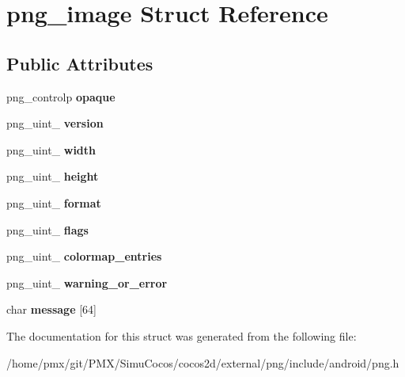 \hypertarget{structpng__image}{}\section{png\+\_\+image Struct Reference}
\label{structpng__image}
\subsection*{Public Attributes}
\begin{DoxyCompactItemize}
\item 
\mbox{\label{structpng__image_a7b502596648744e2ee0c8788e2c6e918}} 
png\+\_\+controlp {\bfseries opaque}
\item 
\mbox{\label{structpng__image_a8c276ba2922051ff0ff9175ab1e23ed1}} 
png\+\_\+uint\+\_ {\bfseries version}
\item 
\mbox{\label{structpng__image_a72ec07853c82c632c2d7b3c68c62b659}} 
png\+\_\+uint\+\_ {\bfseries width}
\item 
\mbox{\label{structpng__image_aaf3cb3eb97ee0938a5e870a96fd1fa48}} 
png\+\_\+uint\+\_ {\bfseries height}
\item 
\mbox{\label{structpng__image_a8a7469310ce4682932b0bc94624f35d1}} 
png\+\_\+uint\+\_ {\bfseries format}
\item 
\mbox{\label{structpng__image_ab9519ecd9acf79b507dad566cc3b379f}} 
png\+\_\+uint\+\_ {\bfseries flags}
\item 
\mbox{\label{structpng__image_a48bf1c6518f03da900f41cd9aa5ae5b7}} 
png\+\_\+uint\+\_ {\bfseries colormap\+\_\+entries}
\item 
\mbox{\label{structpng__image_a1b6e296964e81414b0a1cf232ffbcfce}} 
png\+\_\+uint\+\_ {\bfseries warning\+\_\+or\+\_\+error}
\item 
\mbox{\label{structpng__image_a79795885d73dff1a4aec1cbbb8a4c36f}} 
char {\bfseries message} \mbox{[}64\mbox{]}
\end{DoxyCompactItemize}


The documentation for this struct was generated from the following file\+:\begin{DoxyCompactItemize}
\item 
/home/pmx/git/\+P\+M\+X/\+Simu\+Cocos/cocos2d/external/png/include/android/png.\+h\end{DoxyCompactItemize}
